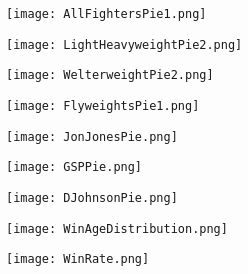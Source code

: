 \documentclass[12pt,english]{report}
\begin{document}
\begin{center}
   \caption{\label{fig:fig1} \textbf{Figure 1:}} 
\end{center}
\begin{figure}[ht]
\centering
\bigskip{}
\texttt{[image: AllFightersPie1.png]}
\end{figure}
\begin{center}
   \caption{\label{fig:fig2} \textbf{Figure 2:}} 
\end{center}
\begin{figure}[ht]
\centering
\bigskip{}
\texttt{[image: LightHeavyweightPie2.png]}
\end{figure}
\pagebreak{}
\begin{center}
   \caption{\label{fig:fig2} \textbf{Figure 3:}} 
\end{center}
\begin{figure}[ht]
\centering
\bigskip{}
\texttt{[image: WelterweightPie2.png]}
\end{figure}
\begin{center}
   \caption{\label{fig:fig2} \textbf{Figure 4:}} 
\end{center}
\begin{figure}[ht]
\centering
\bigskip{}
\texttt{[image: FlyweightsPie1.png]}
\end{figure}
\begin{center}
\pagebreak{}
   \caption{\label{fig:fig2} \textbf{Figure 5:}} 
\end{center}
\begin{figure}[ht]
\centering
\bigskip{}
\texttt{[image: JonJonesPie.png]}
\end{figure}
\begin{center}
   \caption{\label{fig:fig2} \textbf{Figure 6:}} 
\end{center}
\begin{figure}[ht]
\centering
\bigskip{}
\texttt{[image: GSPPie.png]}
\end{figure}
\pagebreak{}
\begin{center}
   \caption{\label{fig:fig2} \textbf{Figure 7:}} 
\end{center}
\begin{figure}[ht]
\centering
\bigskip{}
\texttt{[image: DJohnsonPie.png]}
\end{figure}
\begin{center}
   \caption{\label{fig:fig2} \textbf{Figure 8:}} 
\end{center}
\begin{figure}[ht]
\centering
\bigskip{}
\texttt{[image: WinAgeDistribution.png]}
\end{figure}
\pagebreak{}
\begin{center}
   \caption{\label{fig:fig2} \textbf{Figure 9:}} 
\end{center}
\begin{figure}[ht]
\centering
\bigskip{}
\texttt{[image: WinRate.png]}
\end{figure}
\end{document}
